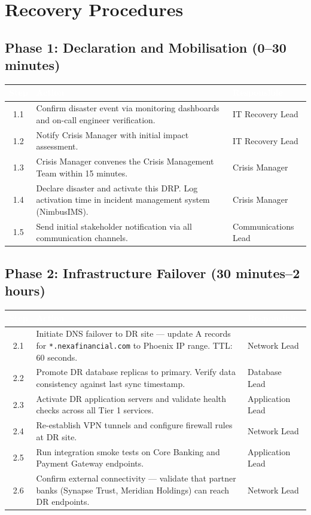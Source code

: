 \section{Recovery Procedures}

\subsection{Phase 1: Declaration and Mobilisation (0--30 minutes)}

\begin{tabularx}{\textwidth}{@{}c X l@{}}
  \toprule
  \rowcolor{tablehead}
  \textcolor{white}{\textbf{Step}} & \textcolor{white}{\textbf{Action}} & \textcolor{white}{\textbf{Responsible}}\\
  \midrule
  1.1 & Confirm disaster event via monitoring dashboards and on-call engineer verification. & IT Recovery Lead\\
  \rowcolor{tablerow}
  1.2 & Notify Crisis Manager with initial impact assessment. & IT Recovery Lead\\
  1.3 & Crisis Manager convenes the Crisis Management Team within 15 minutes. & Crisis Manager\\
  \rowcolor{tablerow}
  1.4 & Declare disaster and activate this DRP. Log activation time in incident management system (NimbusIMS). & Crisis Manager\\
  1.5 & Send initial stakeholder notification via all communication channels. & Communications Lead\\
  \bottomrule
\end{tabularx}

\subsection{Phase 2: Infrastructure Failover (30 minutes--2 hours)}

\begin{tabularx}{\textwidth}{@{}c X l@{}}
  \toprule
  \rowcolor{tablehead}
  \textcolor{white}{\textbf{Step}} & \textcolor{white}{\textbf{Action}} & \textcolor{white}{\textbf{Responsible}}\\
  \midrule
  2.1 & Initiate DNS failover to DR site --- update A records for \texttt{*.nexafinancial.com} to Phoenix IP range. TTL: 60 seconds. & Network Lead\\
  \rowcolor{tablerow}
  2.2 & Promote DR database replicas to primary. Verify data consistency against last sync timestamp. & Database Lead\\
  2.3 & Activate DR application servers and validate health checks across all Tier 1 services. & Application Lead\\
  \rowcolor{tablerow}
  2.4 & Re-establish VPN tunnels and configure firewall rules at DR site. & Network Lead\\
  2.5 & Run integration smoke tests on Core Banking and Payment Gateway endpoints. & Application Lead\\
  \rowcolor{tablerow}
  2.6 & Confirm external connectivity --- validate that partner banks (Synapse Trust, Meridian Holdings) can reach DR endpoints. & Network Lead\\
  \bottomrule
\end{tabularx}

